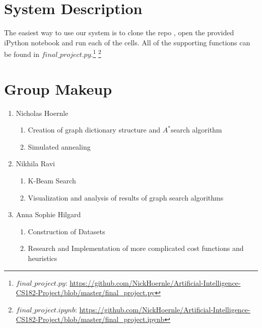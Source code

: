 \documentclass[11pt]{article}
\begin{document}
\newpage
\appendix
\section{System Description}

The easiest way to use our system is to clone the repo , open the provided iPython notebook and run each of the cells. All of the supporting functions can be found in $final\_project.py$.\footnote{$final\_project.py$: \url{https://github.com/NickHoernle/Artificial-Intelligence-CS182-Project/blob/master/final_project.py}} \footnote{$final\_project.ipynb$: \url{https://github.com/NickHoernle/Artificial-Intelligence-CS182-Project/blob/master/final_project.ipynb}}

\section{Group Makeup}

\begin{enumerate}
\item Nicholas Hoernle
\begin{enumerate}
\item Creation of graph dictionary structure and $A^{*}$search algorithm
\item Simulated annealing
\end{enumerate}
\item Nikhila Ravi
\begin{enumerate}
\item K-Beam Search
\item Visualization and analysis of results of graph search algorithms
\end{enumerate}
\item Anna Sophie Hilgard
\begin{enumerate}
\item Construction of Datasets
\item Research and Implementation of more complicated cost functions and heuristics
\end{enumerate}
\end{enumerate}
\end{document}
